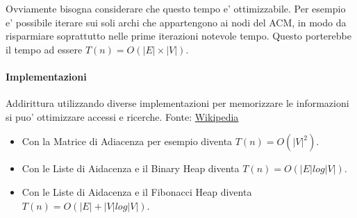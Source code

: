 Ovviamente bisogna considerare che questo tempo e' ottimizzabile. Per esempio e' possibile iterare sui soli archi che appartengono ai nodi del ACM, in modo da risparmiare soprattutto nelle prime iterazioni notevole tempo.
Questo porterebbe il tempo ad essere $T(n) = O(|E| \times |V|)$. \\

\paragraph{Implementazioni}

Addirittura utilizzando diverse implementazioni per memorizzare le informazioni si puo' ottimizzare accessi e ricerche.
Fonte: \href{https://en.wikipedia.org/wiki/Prim%27s_algorithm#Time_complexity}{Wikipedia} \\

\begin{itemize}
\item Con la Matrice di Adiacenza per esempio diventa $T(n) = O(|V|^2)$.
\item Con le Liste di Aidacenza e il Binary Heap diventa $T(n) = O(|E| log |V|)$.
\item Con le Liste di Aidacenza e il Fibonacci Heap diventa $T(n) = O(|E| + |V| log |V|)$.
\end{itemize}